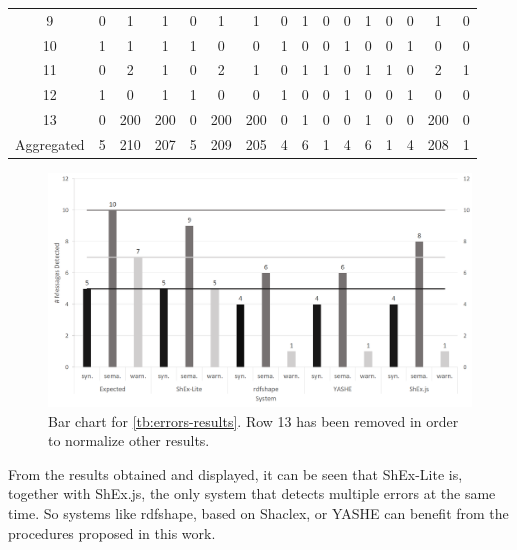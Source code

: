 \begin{table}
{\begin{tabular}{c|ccc|ccc|ccc|ccc|ccc}
    \multicolumn{1}{c|}{9}  & 0       & 1        & 1       & 0       & 1        & 1        & 0       & 1        & 0       & 0       & 1       & 0       & 0       & 1       & 0       \\
    \multicolumn{1}{c|}{10} & 1       & 1        & 1       & 1       & 0        & 0        & 1       & 0        & 0       & 1       & 0       & 0       & 1       & 0       & 0       \\
    \multicolumn{1}{c|}{11} & 0       & 2        & 1       & 0       & 2        & 1        & 0       & 1        & 1       & 0       & 1       & 1       & 0       & 2       & 1       \\
    \multicolumn{1}{c|}{12} & 1       & 0        & 1       & 1       & 0        & 0        & 1       & 0        & 0       & 1       & 0       & 0       & 1       & 0       & 0       \\
    \multicolumn{1}{c|}{13} & 0       & 200      & 200     & 0       & 200      & 200      & 0       & 1        & 0       & 0       & 1       & 0       & 0       & 200     & 0       \\ \hline
    \multicolumn{1}{c|}{Aggregated} & 5       & 210      & 207     & 5       & 209      & 205      & 4       & 6        & 1       & 4       & 6       & 1       & 4       & 208     & 1      
    \end{tabular}}
\end{table}

\begin{figure}
  \includegraphics[width=\textwidth]{images/results-chart.png}
  \centering
  \caption[Bar chart for \cref{tb:errors-results}]{Bar chart for \cref{tb:errors-results}. Row 13 has been removed in order to normalize other results.}
  \label{fig:results-chart}
\end{figure}

From the results obtained and displayed, it can be
seen that ShEx-Lite is, together with ShEx.js, the
only system that detects multiple errors at the same
time. So systems like rdfshape, based on Shaclex, or
YASHE can benefit from the procedures proposed in this
work.

